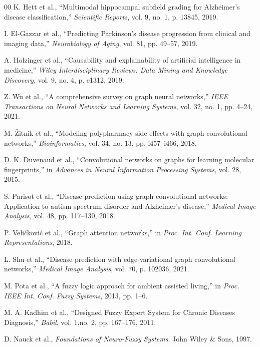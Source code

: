 \documentclass[conference]{IEEEtran}
\begin{document}
\begin{thebibliography}{00}
K. Hett et al., ``Multimodal hippocampal subfield grading for Alzheimer's disease classification,'' \textit{Scientific Reports}, vol. 9, no. 1, p. 13845, 2019.

I. El-Gazzar et al., ``Predicting Parkinson's disease progression from clinical and imaging data,'' \textit{Neurobiology of Aging}, vol. 81, pp. 49--57, 2019.

A. Holzinger et al., ``Causability and explainability of artificial intelligence in medicine,'' \textit{Wiley Interdisciplinary Reviews: Data Mining and Knowledge Discovery}, vol. 9, no. 4, p. e1312, 2019.

Z. Wu et al., ``A comprehensive survey on graph neural networks,'' \textit{IEEE Transactions on Neural Networks and Learning Systems}, vol. 32, no. 1, pp. 4--24, 2021.

M. Žitnik et al., ``Modeling polypharmacy side effects with graph convolutional networks,'' \textit{Bioinformatics}, vol. 34, no. 13, pp. i457--i466, 2018.

D. K. Duvenaud et al., ``Convolutional networks on graphs for learning molecular fingerprints,'' in \textit{Advances in Neural Information Processing Systems}, vol. 28, 2015.

S. Parisot et al., ``Disease prediction using graph convolutional networks: Application to autism spectrum disorder and Alzheimer's disease,'' \textit{Medical Image Analysis}, vol. 48, pp. 117--130, 2018.

P. Veličković et al., ``Graph attention networks,'' in \textit{Proc. Int. Conf. Learning Representations}, 2018.

L. Shu et al., ``Disease prediction with edge-variational graph convolutional networks,'' \textit{Medical Image Analysis}, vol. 70, p. 102036, 2021.

M. Pota et al., ``A fuzzy logic approach for ambient assisted living,'' in \textit{Proc. IEEE Int. Conf. Fuzzy Systems}, 2013, pp. 1--6.

M. A. Kadhim et al., ``Designed Fuzzy Expert System for Chronic Diseases Diagnosis,'' \textit{Babil}, vol. 1,no. 2, pp. 167--176, 2011.

D. Nauck et al., \textit{Foundations of Neuro-Fuzzy Systems}. John Wiley \& Sons, 1997.


\end{thebibliography}
\end{document}

